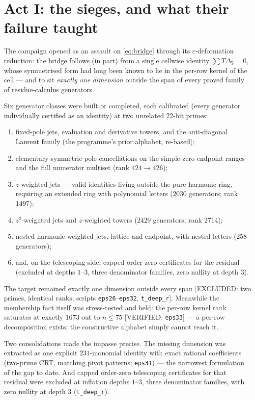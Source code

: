 \documentclass[11pt,reqno]{amsart}
\theoremstyle{plain}
\theoremstyle{definition}
\theoremstyle{remark}
\newcommand{\VerifiedR}[1]{\textup{\textsf{[VERIFIED: #1]}}}
\newcommand{\ExcludedR}[1]{\textup{\textsf{[EXCLUDED: #1]}}}
\begin{document}
\section{Act I: the sieges, and what their failure taught}
\label{sec:sieges}

The campaign opened as an assault on \eqref{eq:bridge} through its
$\varepsilon$-deformation reduction: the bridge follows (in part) from a
single cellwise identity $\sum T\Delta_5=0$, whose symmetrised form had
long been known to lie in the per-row kernel of the cell --- and to sit
\emph{exactly one dimension} outside the span of every proved family of
residue-calculus generators.

Six generator classes were built or completed, each calibrated (every
generator individually certified as an identity) at two unrelated 22-bit
primes:
\begin{enumerate}[leftmargin=2em,itemsep=1pt]
\item fixed-pole jets, evaluation and derivative towers, and the
anti-diagonal Laurent family (the programme's prior alphabet, re-based);
\item elementary-symmetric pole cancellations on the simple-zero endpoint
ranges and the full numerator multiset (rank $424\to426$);
\item $z$-weighted jets --- valid identities living outside the pure
harmonic ring, requiring an extended ring with polynomial letters
($2030$ generators; rank $1497$);
\item $z^2$-weighted jets and $z$-weighted towers ($2429$ generators;
rank $2714$);
\item nested harmonic-weighted jets, lattice and endpoint, with nested
letters ($258$ generators);
\item and, on the telescoping side, capped order-zero certificates for
the residual (excluded at depths $1$--$3$, three denominator families,
zero nullity at depth 3).
\end{enumerate}
The target remained exactly one dimension outside every span
\ExcludedR{two primes, identical ranks; scripts
\texttt{eps26}--\texttt{eps32}, \texttt{t\_deep\_r}}. Meanwhile the membership fact itself was
stress-tested and held: the per-row kernel rank saturates at exactly
$1673$ out to $n\le75$ \VerifiedR{\texttt{eps33}} --- a per-row
decomposition exists; the constructive alphabet simply cannot reach it.

Two consolidations made the impasse precise. The missing dimension was
extracted as one explicit $231$-monomial identity with exact rational
coefficients (two-prime CRT, matching pivot patterns;
\texttt{eps31}) --- the narrowest formulation of the gap to date. And
capped order-zero telescoping certificates for that residual were
excluded at inflation depths $1$--$3$, three denominator families, with
zero nullity at depth 3 (\texttt{t\_deep\_r}).
\end{document}
